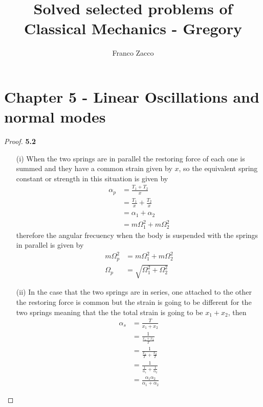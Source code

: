 \documentclass[11pt]{article}
\title{\textbf{Solved selected problems of Classical Mechanics - Gregory}}
\author{Franco Zacco}
\date{}
\theoremstyle{definition}
\begin{document}
\maketitle
\thispagestyle{empty}

\section*{Chapter 5 - Linear Oscillations and normal modes}

	\begin{proof}{\textbf{5.2}}
    \begin{itemize}
        \item [(i)] When the two springs are in parallel the restoring force
        of each one is summed and they have a common strain given by $x$, so
        the equivalent spring constant or strength in this situation is given
        by
        \begin{align*}
            \alpha_p &= \frac{T_1 + T_2}{x} \\
                &= \frac{T_1}{x} + \frac{T_2}{x} \\
                &= \alpha_1 + \alpha_2 \\
                &= m\Omega_1^2 + m\Omega_2^2
        \end{align*}
        therefore the angular frecuency when the body is suspended with the
        springs in parallel is given by
        \begin{align*}
           m\Omega_p^2 &= m\Omega_1^2 + m\Omega_2^2 \\
           \Omega_p &= \sqrt{\Omega_1^2 + \Omega_2^2}
        \end{align*}
        \item[(ii)] In the case that the two springs are in series, one
        attached to the other the restoring force is common but the strain
        is going to be different for the two springs meaning that the the total
        strain is going to be $x_1 + x_2$, then
        \begin{align*}
            \alpha_s &= \frac{T}{x_1 + x_2} \\
                &= \frac{1}{\frac{x_1 + x_2}{T}} \\
                &= \frac{1}{\frac{x_1}{T} + \frac{x_2}{T}} \\
                &= \frac{1}{\frac{1}{\alpha_1} + \frac{1}{\alpha_2}} \\
                &= \frac{\alpha_1\alpha_2}{\alpha_1 + \alpha_2}
        \end{align*}

\end{itemize}
\end{proof}
\end{document}

